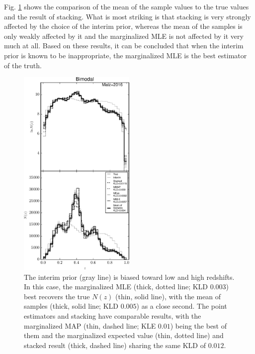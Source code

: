 \documentclass[preprint]{aastex}
\begin{document}
Fig. \ref{fig:intb-comp} shows the comparison of the mean of the sample values 
to the true values and the result of stacking.  What is most striking is that 
stacking is very strongly affected by the choice of the interim prior, whereas 
the mean of the samples is only weakly affected by it and the marginalized MLE 
is not affected by it very much at all.  Based on these results, it can be 
concluded that when the interim prior is known to be inappropriate, the 
marginalized MLE is the best estimator of the truth.  


\begin{figure}
\includegraphics[width=0.5\textwidth]{figs/bint/comps.pdf}
\caption{The interim prior (gray line) is biased toward low and high redshifts. 
 In this case, the marginalized MLE (thick, dotted line; KLD $0.003$) best 
recovers the true $N(z)$ (thin, solid line), with the mean of samples (thick, 
solid line; KLD $0.005$) as a close second.  The point estimators and stacking 
have comparable results, with the marginalized MAP (thin, dashed line; KLE 
$0.01$) being the best of them and the marginalized expected value (thin, 
dotted line) and stacked result (thick, dashed line) sharing the same KLD of 
$0.012$.}
\label{fig:intb-comp}
\end{figure}
\end{document}
